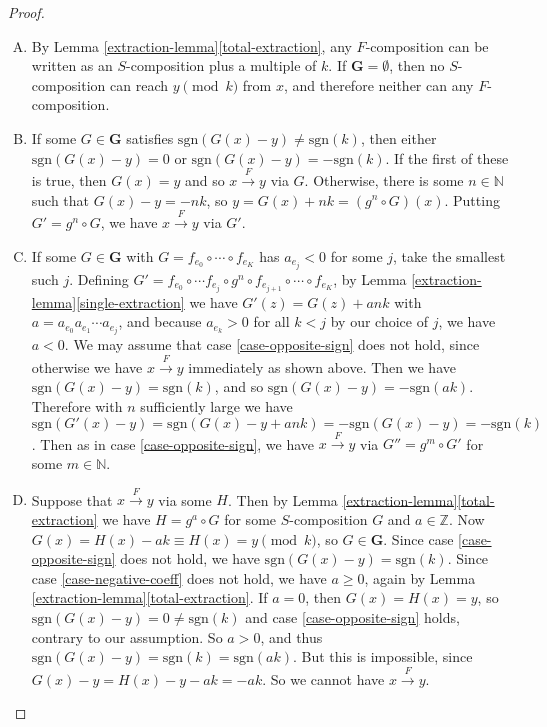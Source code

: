 \documentclass[11pt]{amsart}
\newcommand{\N}{\mathbb{N}}
\newcommand{\Z}{\mathbb{Z}}
\newcommand{\sgn}[1]{\mathrm{sgn}(#1)}
\theoremstyle{definition}
\theoremstyle{remark}
\begin{document}
\begin{proof}
\begin{enumerate}[(A)]
\item By Lemma \ref{extraction-lemma}\ref{total-extraction}, any $F$-composition can be written as an $S$-composition plus a multiple of $k$. If $\mathbf{G} = \emptyset$, then no $S$-composition can reach $y \pmod k$ from $x$, and therefore neither can any $F$-composition.
\item If some $G \in \mathbf{G}$ satisfies $\sgn{G(x) - y} \ne \sgn{k}$, then either $\sgn{G(x) - y} = 0$ or $\sgn{G(x) - y} = -\sgn{k}$. If the first of these is true, then $G(x) = y$ and so $x \xrightarrow{F} y$ via $G$. Otherwise, there is some $n \in \N$ such that $G(x) - y = -nk$, so $y = G(x) + nk = (g^n \circ G)(x)$. Putting $G' = g^n \circ G$, we have $x \xrightarrow{F} y$ via $G'$.
\item If some $G \in \mathbf{G}$ with $G = f_{e_0} \circ \cdots \circ f_{e_K}$ has $a_{e_j} < 0$ for some $j$, take the smallest such $j$. Defining $G' = f_{e_0} \circ \cdots f_{e_j} \circ g^n \circ f_{e_{j+1}} \circ \cdots \circ f_{e_K}$, by Lemma \ref{extraction-lemma}\ref{single-extraction} we have $G'(z) = G(z) + a n k$ with $a = a_{e_0} a_{e_1} \cdots a_{e_j}$, and because $a_{e_k} > 0$ for all $k < j$ by our choice of $j$, we have $a < 0$. We may assume that case \ref{case-opposite-sign} does not hold, since otherwise we have $x \xrightarrow{F} y$ immediately as shown above. Then we have $\sgn{G(x) - y} = \sgn{k}$, and so $\sgn{G(x) - y} = -\sgn{ak}$. Therefore with $n$ sufficiently large we have $\sgn{G'(x) - y} = \sgn{G(x) - y + ank} = -\sgn{G(x) - y} = -\sgn{k}$. Then as in case \ref{case-opposite-sign}, we have $x \xrightarrow{F} y$ via $G'' = g^m \circ G'$ for some $m \in \N$.
\item Suppose that $x \xrightarrow{F} y$ via some $H$. Then by Lemma \ref{extraction-lemma}\ref{total-extraction} we have $H = g^a \circ G$ for some $S$-composition $G$ and $a \in \Z$. Now $G(x) = H(x) - ak \equiv H(x) = y \pmod k$, so $G \in \mathbf{G}$. Since case \ref{case-opposite-sign} does not hold, we have $\sgn{G(x) - y} = \sgn{k}$. Since case \ref{case-negative-coeff} does not hold, we have $a \ge 0$, again by Lemma \ref{extraction-lemma}\ref{total-extraction}. If $a = 0$, then $G(x) = H(x) = y$, so $\sgn{G(x) - y} = 0 \ne \sgn{k}$ and case \ref{case-opposite-sign} holds, contrary to our assumption. So $a > 0$, and thus $\sgn{G(x) -y} = \sgn{k} = \sgn{ak}$. But this is impossible, since $G(x) - y = H(x) - y - ak = -ak$. So we cannot have $x \xrightarrow{F} y$. \qedhere
\end{enumerate}
\end{proof}
\end{document}
